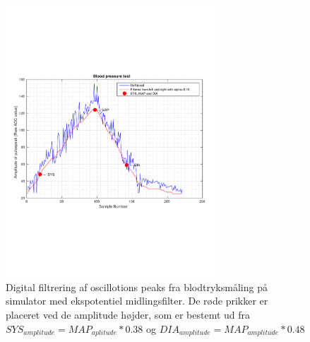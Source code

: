 \begin{figure}[H]
	\centering
	\includegraphics[trim={0 0 0 0},clip, width=0.7\textwidth]{billeder/digitalFilterDataSysMapDia.pdf}	
	\parbox{10.5cm}{\caption{Digital filtrering af oscillotions peaks fra blodtryksmåling på simulator med ekspotentiel midlingsfilter. De røde prikker er placeret ved de amplitude højder, som er bestemt ud fra $SYS_{amplitude}=MAP_{aplitude}*0.38$ og $DIA_{amplitude}=MAP_{amplitude}*0.48$ }\label{fig:digitalFilterDataSysMapDia}}
\end{figure}
  